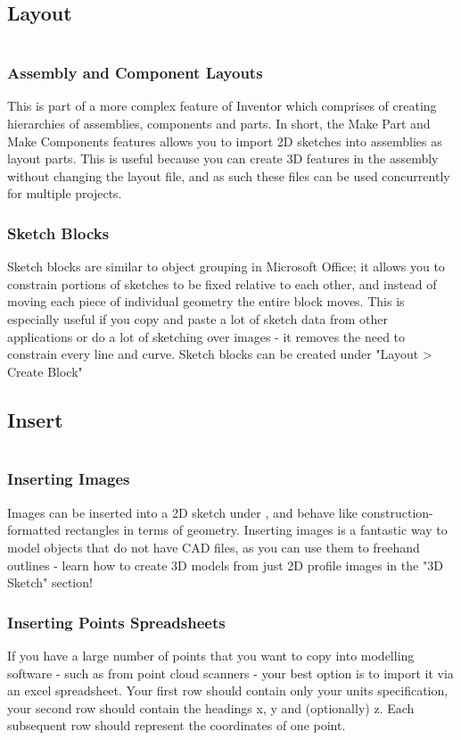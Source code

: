 \begin{enumerate}
\subsection{Layout}

$ $

\subsubsection{Assembly and Component Layouts}
This is part of a more complex feature of Inventor which comprises of creating hierarchies of assemblies, components and parts. In short, the Make Part and Make Components features allows you to import 2D sketches into assemblies as layout parts. This is useful because you can create 3D features in the assembly without changing the layout file, and as such these files can be used concurrently for multiple projects.

\subsubsection{Sketch Blocks}
Sketch blocks are similar to object grouping in Microsoft Office; it allows you to constrain portions of sketches to be fixed relative to each other, and instead of moving each piece of individual geometry the entire block moves. This is especially useful if you copy and paste a lot of sketch data from other applications or do a lot of sketching over images - it removes the need to constrain every line and curve. Sketch blocks can be created under "Layout > Create Block"

\subsection{Insert}

$ $

\subsubsection{Inserting Images}
Images can be inserted into a 2D sketch under , and behave like construction-formatted rectangles in terms of geometry. Inserting images is a fantastic way to model objects that do not have CAD files, as you can use them to freehand outlines - learn how to create 3D models from just 2D profile images in the "3D Sketch" section!

\subsubsection{Inserting Points Spreadsheets}
If you have a large number of points that you want to copy into modelling software - such as from point cloud scanners - your best option is to import it via an excel spreadsheet. Your first row should contain only your units specification, your second row should contain the headings x, y and (optionally) z. Each subsequent row should represent the coordinates of one point.


\end{enumerate}
